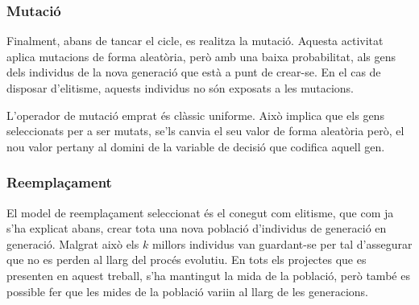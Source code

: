 \documentclass[titlepage,a4paper,12pt]{book}
\begin{document}
\subsubsection{Mutació}

Finalment, abans de tancar el cicle, es realitza la mutació. Aquesta activitat
aplica mutacions de forma aleatòria, però amb una baixa probabilitat, als gens
dels individus de la nova generació que està a punt de crear-se. En el cas de
disposar d'elitisme, aquests individus no són exposats a les mutacions.

L'operador de mutació emprat és clàssic uniforme. Això implica que els gens
seleccionats per a ser mutats, se'ls canvia el seu valor de forma aleatòria
però, el nou valor pertany al domini de la variable de decisió que codifica
aquell gen.

\subsubsection{Reemplaçament}

El model de reemplaçament seleccionat és el conegut com elitisme, que com ja
s'ha explicat abans, crear tota una nova població d'individus de generació en
generació. Malgrat això els $k$ millors individus van guardant-se per tal
d'assegurar que no es perden al llarg del procés evolutiu.  En tots els
projectes que es presenten en aquest treball, s'ha mantingut la mida de la
població, però també es possible fer que les mides de la població variin al
llarg de les generacions.


\end{document}
